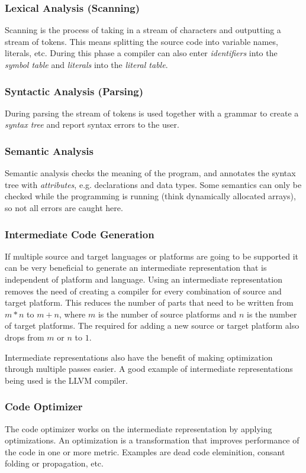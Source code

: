 \documentclass{article}
\begin{document}
\subsubsection{Lexical Analysis (Scanning)}
Scanning is the process of taking in a stream of characters and outputting a stream of tokens.
This means splitting the source code into variable names, literals, etc.
During this phase a compiler can also enter \emph{identifiers} into the \emph{symbol table} and \emph{literals} into the \emph{literal table}.

\subsubsection{Syntactic Analysis (Parsing)}
During parsing the stream of tokens is used together with a grammar to create a \emph{syntax tree} and report syntax errors to the user.

\subsubsection{Semantic Analysis}
Semantic analysis checks the meaning of the program, and annotates the syntax tree with \emph{attributes}, e.g. declarations and data types.
Some semantics can only be checked while the programming is running (think dynamically allocated arrays), so not all errors are caught here.

\subsubsection{Intermediate Code Generation}
If multiple source and target languages or platforms are going to be supported it can be very beneficial to generate an intermediate representation that is independent of platform and language.
Using an intermediate representation removes the need of creating a compiler for every combination of source and target platform.
This reduces the number of parts that need to be written from $m*n$ to $m+n$, where $m$ is the number of source platforms and $n$ is the number of target platforms.
The required for adding a new source or target platform also drops from $m$ or $n$ to $1$.

Intermediate representations also have the benefit of making optimization through multiple passes easier.
A good example of intermediate representations being used is the LLVM compiler.

\subsubsection{Code Optimizer}
The code optimizer works on the intermediate representation by applying optimizations.
An optimization is a transformation that improves performance of the code in one or more metric.
Examples are dead code eleminition, consant folding or propagation, etc.
\end{document}
